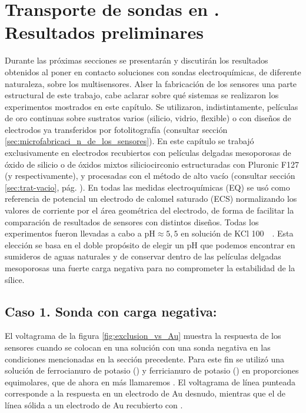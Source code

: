 \section{Transporte de sondas en \pdm. Resultados preliminares}

	 Durante las próximas secciones se presentarán y discutirán los resultados obtenidos al poner en contacto soluciones con sondas electroquímicas, de diferente naturaleza, sobre los multisensores. Al\space ser la fabricación de los sensores una parte estructural de este trabajo, cabe aclarar sobre qué sistemas se realizaron los experimentos mostrados en este capítulo. Se utilizaron, indistintamente, películas de oro continuas sobre sustratos varios (silicio, vidrio, flexible) o con diseños de electrodos ya transferidos por fotolitografía (consultar sección \ref{sec:microfabricaci_n_de_los_sensores}). En este capítulo se trabajó exclusivamente en electrodos recubiertos con películas delgadas mesoporosas de óxido de silicio o de óxidos mixtos silicio\textbar circonio estructuradas con Pluronic F127 (\pdmF\space y \pdmZ\space respectivamente), y procesadas con el método de alto vacío (consultar sección \ref{sec:trat-vacio}, pág. \pageref{sec:trat-vacio}). En todas las medidas electroquímicas (EQ) se usó como referencia de potencial un electrodo de calomel saturado (ECS) normalizando los valores de corriente por el área geométrica del electrodo, de forma de facilitar la comparación de resultados de sensores con distintos diseños. Todas los experimentos fueron llevadas a cabo a $\text{pH}\approx5,5$ en solución de KCl \SI{100}{\milli\Molar}. Esta elección se basa en el doble propósito de elegir un pH que podemos encontrar en sumideros de aguas naturales y de conservar dentro de las películas delgadas mesoporosas una fuerte carga negativa para no comprometer la estabilidad de la sílice.

	\subsection{Caso 1. Sonda con carga negativa: \texorpdfstring{\ferroferri}{ferroferri}}

	 El voltagrama de la figura \ref{fig:exclusion_vs_Au} muestra la respuesta de los sensores cuando se colocan en una solución con una sonda negativa en las condiciones mencionadas en la sección precedente. Para este fin se utilizó una solución de ferrocianuro de potasio (\ferroCompleto) y ferricianuro de potasio (\ferriCompleto) en proporciones equimolares, que de ahora en más llamaremos \fe. El voltagrama de línea punteada corresponde a la respuesta en un electrodo de Au desnudo, mientras que el de línea sólida a un electrodo de Au recubierto con \pdmF.
	
